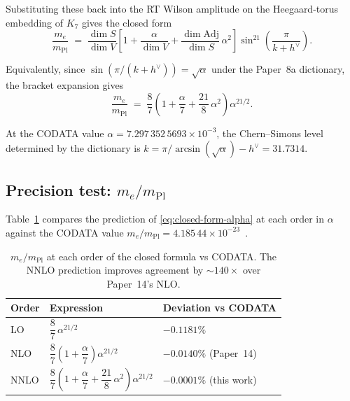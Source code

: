 \documentclass[11pt]{article}
\newcommand{\Adj}{\mathrm{Adj}}
\newcommand{\mPl}{m_{\mathrm{Pl}}}
\newcommand{\hv}{h^{\vee}}
\begin{document}
\noindent
Substituting these back into the RT Wilson amplitude on the
Heegaard-torus embedding of $K_7$ gives the closed form
\begin{equation}
  \frac{m_e}{\mPl}
  \;=\;
  \frac{\dim S}{\dim V}
  \left[ 1 + \frac{\alpha}{\dim V}
         + \frac{\dim \Adj}{\dim S}\,\alpha^2 \right]
  \sin^{21}\!\left(\frac{\pi}{k + \hv}\right).
  \label{eq:closed-form}
\end{equation}

\noindent
Equivalently, since $\sin(\pi/(k+\hv)) = \sqrt{\alpha}$ under the
Paper~8a dictionary, the bracket expansion gives
\begin{equation}
  \frac{m_e}{\mPl}
  \;=\;
  \frac{8}{7}\left(1
              + \frac{\alpha}{7}
              + \frac{21}{8}\,\alpha^2\right)
  \alpha^{21/2}.
  \label{eq:closed-form-alpha}
\end{equation}

\noindent
At the CODATA value $\alpha = 7.297\,352\,5693\times 10^{-3}$,
the Chern--Simons level determined by the dictionary is
$k = \pi/\arcsin(\sqrt{\alpha}) - \hv = 31.7314$.

\subsection{Precision test: $m_e/\mPl$}
\label{sec:closed-me-mpl}

Table~\ref{tab:me-mpl-precision} compares the prediction of
\eqref{eq:closed-form-alpha} at each order in $\alpha$ against the
CODATA value
$m_e/\mPl = 4.185\,44\times 10^{-23}$~\cite{codata2018}.

\begin{table}[H]
\centering
\caption{$m_e/\mPl$ at each order of the closed formula vs CODATA.
  The NNLO prediction improves agreement by $\sim\!140\times$ over
  Paper~14's NLO.}
\label{tab:me-mpl-precision}
\begin{tabular}{lll}
\toprule
Order & Expression & Deviation vs CODATA \\
\midrule
LO    & $\dfrac{8}{7}\,\alpha^{21/2}$
      & $-0.1181\%$ \\[6pt]
NLO   & $\dfrac{8}{7}\left(1 + \dfrac{\alpha}{7}\right)\alpha^{21/2}$
      & $-0.0140\%$ \quad (Paper~14) \\[6pt]
NNLO  & $\dfrac{8}{7}\left(1 + \dfrac{\alpha}{7} + \dfrac{21}{8}\,\alpha^2\right)\alpha^{21/2}$
      & $-0.0001\%$ \quad (this work) \\
\bottomrule
\end{tabular}
\end{table}
\end{document}
